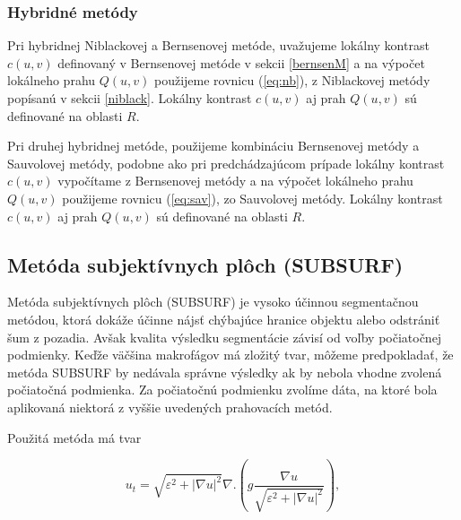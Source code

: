 \documentclass[a4paper,11pt,oneside]{article}%
\def\epsilon{\varepsilon}
\begin{document}

\subsubsection{Hybridné metódy}

Pri hybridnej Niblackovej a Bernsenovej metóde, uvažujeme lokálny kontrast $c(u, v)$ definovaný v Bernsenovej metóde v sekcii \ref{bernsenM} a na výpočet lokálneho prahu $Q(u, v)$ použijeme rovnicu (\ref{eq:nb}), z Niblackovej metódy popísanú v sekcii \ref{niblack}. Lokálny kontrast $c(u, v)$ aj prah $Q(u, v)$ sú definované na oblasti $R$.

Pri druhej hybridnej metóde, použijeme kombináciu Bernsenovej metódy a Sauvolovej metódy, podobne ako pri predchádzajúcom prípade lokálny kontrast $c(u, v)$ vypočítame z Bernsenovej metódy a na výpočet lokálneho prahu $Q(u, v)$ použijeme rovnicu (\ref{eq:sav}), zo Sauvolovej metódy. Lokálny kontrast $c(u, v)$ aj prah $Q(u, v)$ sú definované na oblasti $R$.

\subsection{Metóda subjektívnych plôch (SUBSURF)} 

Metóda subjektívnych plôch (SUBSURF) je vysoko účinnou segmentačnou metódou, ktorá dokáže účinne nájsť chýbajúce hranice objektu alebo odstrániť šum z pozadia. Avšak kvalita výsledku segmentácie závisí od voľby počiatočnej podmienky. Keďže väčšina makrofágov má zložitý tvar, môžeme predpokladať, že metóda SUBSURF by nedávala správne výsledky ak by nebola vhodne zvolená počiatočná podmienka. Za počiatočnú podmienku zvolíme dáta, na ktoré bola aplikovaná niektorá z vyššie uvedených prahovacích metód.

Použitá metóda má tvar

\begin{equation} \label{eq:subsurf}
u_t = \sqrt{\epsilon^2 + |\nabla u|^2}\nabla.(g \frac{\nabla u}{\sqrt{\epsilon^2 + |\nabla u|^2}}),
\end{equation}
\end{document}
